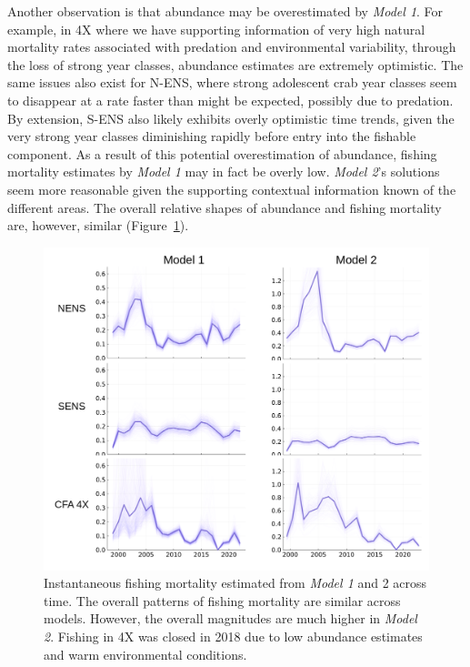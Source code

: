 \documentclass[
	letterpaper, %
	10pt, %
]{article}
\begin{document}
Another observation is that abundance may be overestimated by \emph{Model
1}. For example, in 4X where we have supporting information of very
high natural mortality rates associated with predation and environmental
variability, through the loss of strong year classes, abundance estimates
are extremely optimistic. The same issues also exist for N-ENS, where
strong adolescent crab year classes seem to disappear at a rate faster
than might be expected, possibly due to predation. By extension, S-ENS
also likely exhibits overly optimistic time trends, given the very
strong year classes diminishing rapidly before entry into the fishable
component. As a result of this potential overestimation of abundance,
fishing mortality estimates by \emph{Model 1} may in fact be overly low.
\emph{Model 2}'s solutions seem more reasonable given the supporting contextual information
known of the different areas. The overall relative shapes of abundance
and fishing mortality are, however, similar (Figure~\ref{fig7}).

   
\begin{figure}
    \includegraphics[width=\linewidth]{media/fishing_mortality.png}
    \caption{Instantaneous fishing mortality estimated from \emph{Model 1}
    and 2 across time. The overall patterns of fishing mortality are similar
    across models. However, the overall magnitudes are much higher in
    \emph{Model 2}. Fishing in 4X was closed in 2018 due to low abundance estimates
    and warm environmental conditions.}
	\label{fig7}
    \end{figure}   
\end{document}
